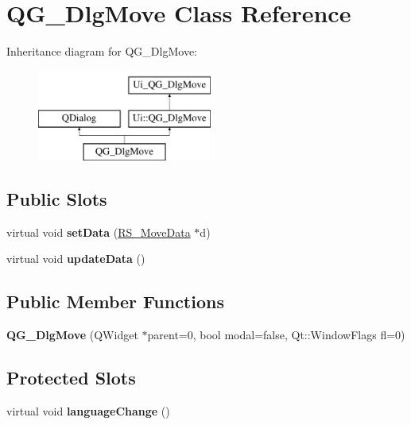 \hypertarget{classQG__DlgMove}{\section{Q\-G\-\_\-\-Dlg\-Move Class Reference}
\label{classQG__DlgMove}
}
Inheritance diagram for Q\-G\-\_\-\-Dlg\-Move\-:\begin{figure}[H]
\begin{center}
\leavevmode
\includegraphics[height=3.000000cm]{classQG__DlgMove}
\end{center}
\end{figure}
\subsection*{Public Slots}
\begin{DoxyCompactItemize}
\item 
\hypertarget{classQG__DlgMove_a94159b42b24b802f29d53c9e16f19727}{virtual void {\bfseries set\-Data} (\hyperlink{classRS__MoveData}{R\-S\-\_\-\-Move\-Data} $\ast$d)}\label{classQG__DlgMove_a94159b42b24b802f29d53c9e16f19727}

\item 
\hypertarget{classQG__DlgMove_aa0a1ad6cbeaddb094533b7cff9cb8440}{virtual void {\bfseries update\-Data} ()}\label{classQG__DlgMove_aa0a1ad6cbeaddb094533b7cff9cb8440}

\end{DoxyCompactItemize}
\subsection*{Public Member Functions}
\begin{DoxyCompactItemize}
\item 
\hypertarget{classQG__DlgMove_afbce3605aa601e2df983549401203860}{{\bfseries Q\-G\-\_\-\-Dlg\-Move} (Q\-Widget $\ast$parent=0, bool modal=false, Qt\-::\-Window\-Flags fl=0)}\label{classQG__DlgMove_afbce3605aa601e2df983549401203860}

\end{DoxyCompactItemize}
\subsection*{Protected Slots}
\begin{DoxyCompactItemize}
\item 
\hypertarget{classQG__DlgMove_a90e5d5252c1dcbe4ddfccfba18863a19}{virtual void {\bfseries language\-Change} ()}\label{classQG__DlgMove_a90e5d5252c1dcbe4ddfccfba18863a19}

\end{DoxyCompactItemize}
